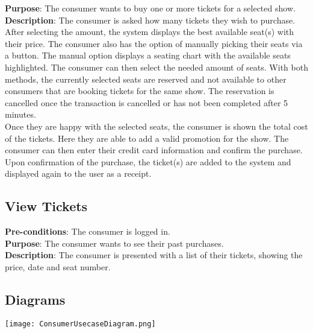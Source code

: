 \textbf{Purpose}: The consumer wants to buy one or more tickets for
a selected show.\\

\textbf{Description}: The consumer is asked how many tickets they
wish to purchase. After selecting the amount, the system displays
the best available seat(s) with their price. The consumer also has
the option of manually picking their seats via a button. The manual
option displays a seating chart with the available seats
highlighted. The consumer can then select the needed amount of
seats. With both methods, the currently selected seats are reserved
and not available to other consumers that are booking tickets for
the same show. The reservation is cancelled once the transaction
is cancelled or has not been completed after 5 minutes.\\

Once they are happy with the selected seats, the consumer is
shown the total cost of the tickets. Here they are able to add a
valid promotion for the show. The consumer can then enter their
credit card information and confirm the purchase.\\

Upon confirmation of the purchase, the ticket(s) are added to the
system and displayed again to the user as a receipt.

\subsection{View Tickets}
\textbf{Pre-conditions}: The consumer is logged in.\\

\textbf{Purpose}: The consumer wants to see their past purchases.\\

\textbf{Description}: The consumer is presented with a list of
their tickets, showing the price, date and seat number.

\subsection{Diagrams}

\texttt{[image: ConsumerUsecaseDiagram.png]}
